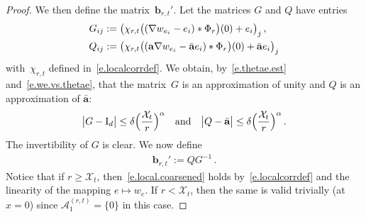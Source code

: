 \documentclass[11pt]{article} %
\numberwithin{equation}{section}
\theoremstyle{definition}
\newcommand*{\Id}{\ensuremath{\mathrm{I}_d}}
\renewcommand{\b}{\ensuremath{\mathbf{b}}}
\newcommand{\qand}{\quad \mbox{and} \quad }
\renewcommand{\a}{\mathbf{a}}
\newcommand{\ahom}{\bar{\a}}
\newcommand{\X}{\mathcal{X}}
\newcommand{\minscale}{\chi}
\begin{document}
\begin{proof}
\smallskip

We then define the matrix~$\b_{r,t}' $. Let the matrices $G$ and $Q$ have entries 
\begin{align} \label{e.JandQ}
\notag
G_{ij} & := \bigl(  \minscale_{r,t}  \bigl((\nabla w_{e_i} - e_i) \ast \Phi_{r}\bigr)(0)+ e_i \bigl)_j \,, 
\\ 
Q_{ij} & := \bigl(  \minscale_{r,t}  \bigl((\a \nabla w_{e_i} - \ahom e_i) \ast \Phi_{r}\bigr)(0)+ \ahom e_i \bigl)_j
\end{align}
with~$\minscale_{r,t}$ defined in~\eqref{e.localcorrdef}.
We obtain, by~\eqref{e.thetae.est} and~\eqref{e.we.vs.thetae}, that the matrix~$G$ is an approximation of unity and $Q$ is an approximation of $\ahom$:
\begin{align*}  
\big| G - \Id \big| \leq \delta  \Bigl( \frac{\X_t}{r} \Bigr)^{\alpha} 
\qand 
\big| Q - \ahom \big| \leq \delta  \Bigl( \frac{\X_t}{r} \Bigr)^{\alpha} \,.
\end{align*}
The invertibility of $G$ is clear. We now define 
\begin{align*}  
\b_{r,t}' := Q G^{-1}  \,.
\end{align*}
Notice that if $r \geq \X_t$, then~\eqref{e.local.coarsened} holds by~\eqref{e.localcorrdef} and the linearity of the mapping $e\mapsto w_e$.  If $r < \X_t$, then the same is valid trivially (at~$x = 0$) since $\mathcal{A}_1^{(r,t)} = \{0\}$ in this case. 

\smallskip


\end{proof}
\end{document}
